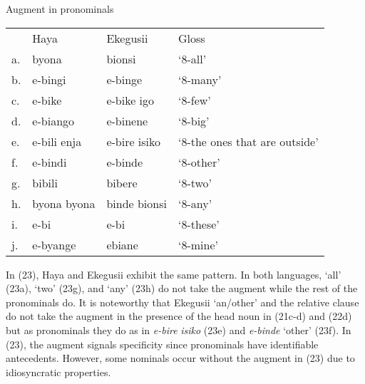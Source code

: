 \documentclass[output=paper]{langscibook}
\begin{document}
\begin{exe}
\ex Augment in pronominals  \\
\label{hayagusii23}
\begin{tabular}{llll}
          &    Haya	&		Ekegusii &		Gloss	\\	 
a.	& byona		&	bionsi		&	‘8-all’ \\
b. & 	e-bingi	&		e-binge	&		‘8-many’ \\
c. &	e-bike	&		e-bike igo 	&	‘8-few’\\
d. &	e-biango &		e-binene	&	‘8-big’\\
e. &	e-bili enja	&	e-bire isiko &		‘8-the ones that are outside’\\
f. &	e-bindi		 &	e-binde		&	‘8-other’ \\
g. &	bibili	&		bibere		&	‘8-two’\\
h. &	byona byona	&	binde bionsi &		‘8-any’\\
i. &	e-bi	&		e-bi		&	‘8-these’\\
j. &	e-byange	&	ebiane		&	‘8-mine’\\

\end{tabular}
\end{exe}
In (23), Haya and Ekegusii exhibit the same pattern. In both languages, ‘all’ (23a), ‘two’ (23g), and ‘any’ (23h) do not take the augment while the rest of the pronominals do. It is noteworthy that Ekegusii ‘an/other’ and the relative clause do not take the augment in the presence of the head noun in (21c-d) and (22d) but as pronominals they do as in \textit{e-bire} \textit{isiko} (23e) and \textit{e-binde} ‘other’ (23f). In (23), the augment signals specificity since pronominals have identifiable antecedents. However, some nominals occur without the augment in (23) due to idiosyncratic properties. 
\end{document}
